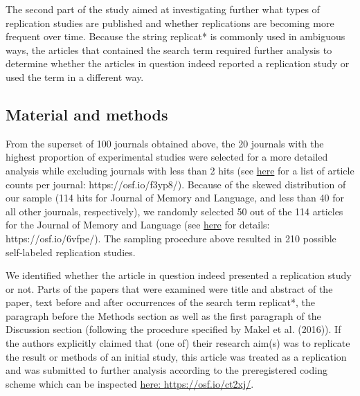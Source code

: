 \documentclass[]{elsarticle} %
\begin{document}
The second part of the study aimed at investigating further what types of replication studies are published and whether replications are becoming more frequent over time.
Because the string replicat* is commonly used in ambiguous ways, the articles that contained the search term required further analysis to determine whether the articles in question indeed reported a replication study or used the term in a different way.

\hypertarget{material-and-methods}{%
\subsection{Material and methods}\label{material-and-methods}}

From the superset of 100 journals obtained above, the 20 journals with the highest proportion of experimental studies were selected for a more detailed analysis while excluding journals with less than 2 hits (see \href{https://osf.io/f3yp8/}{here} for a list of article counts per journal: https://osf.io/f3yp8/).
Because of the skewed distribution of our sample (114 hits for Journal of Memory and Language, and less than 40 for all other journals, respectively), we randomly selected 50 out of the 114 articles for the Journal of Memory and Language (see \href{https://osf.io/6vfpe/}{here} for details: https://osf.io/6vfpe/).
The sampling procedure above resulted in 210 possible self-labeled replication studies.

We identified whether the article in question indeed presented a replication study or not.
Parts of the papers that were examined were title and abstract of the paper, text before and after occurrences of the search term replicat*, the paragraph before the Methods section as well as the first paragraph of the Discussion section (following the procedure specified by Makel et al. (2016)).
If the authors explicitly claimed that (one of) their research aim(s) was to replicate the result or methods of an initial study, this article was treated as a replication and was submitted to further analysis according to the preregistered coding scheme which can be inspected \href{https://osf.io/ct2xj/}{here: https://osf.io/ct2xj/}.
\end{document}
